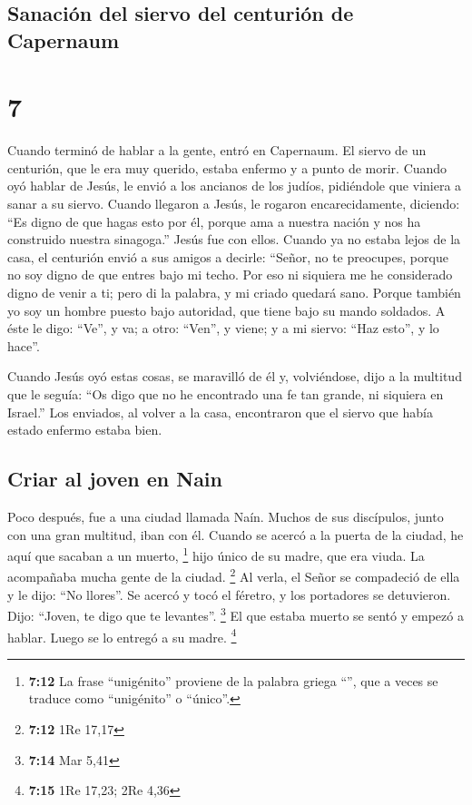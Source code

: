 \hypertarget{sanaciuxf3n-del-siervo-del-centuriuxf3n-de-capernaum}{%
\subsection{Sanación del siervo del centurión de
Capernaum}\label{sanaciuxf3n-del-siervo-del-centuriuxf3n-de-capernaum}}

\hypertarget{section-6}{%
\section{7}\label{section-6}}

 Cuando terminó de hablar a la gente, entró en Capernaum.
 El siervo de un centurión, que le era muy querido, estaba
enfermo y a punto de morir.  Cuando oyó hablar de Jesús,
le envió a los ancianos de los judíos, pidiéndole que viniera a sanar a
su siervo.  Cuando llegaron a Jesús, le rogaron
encarecidamente, diciendo: ``Es digno de que hagas esto por él,
 porque ama a nuestra nación y nos ha construido nuestra
sinagoga.''  Jesús fue con ellos. Cuando ya no estaba
lejos de la casa, el centurión envió a sus amigos a decirle: ``Señor, no
te preocupes, porque no soy digno de que entres bajo mi techo.
 Por eso ni siquiera me he considerado digno de venir a
ti; pero di la palabra, y mi criado quedará sano.  Porque
también yo soy un hombre puesto bajo autoridad, que tiene bajo su mando
soldados. A éste le digo: ``Ve'', y va; a otro: ``Ven'', y viene; y a mi
siervo: ``Haz esto'', y lo hace''.

 Cuando Jesús oyó estas cosas, se maravilló de él y,
volviéndose, dijo a la multitud que le seguía: ``Os digo que no he
encontrado una fe tan grande, ni siquiera en Israel.'' 
Los enviados, al volver a la casa, encontraron que el siervo que había
estado enfermo estaba bien.

\hypertarget{criar-al-joven-en-nain}{%
\subsection{Criar al joven en Nain}\label{criar-al-joven-en-nain}}

 Poco después, fue a una ciudad llamada Naín. Muchos de
sus discípulos, junto con una gran multitud, iban con él.
 Cuando se acercó a la puerta de la ciudad, he aquí que
sacaban a un muerto, \footnote{\textbf{7:12} La frase ``unigénito''
  proviene de la palabra griega ``'', que a veces se
  traduce como ``unigénito'' o ``único''.} hijo único de su madre, que
era viuda. La acompañaba mucha gente de la ciudad. \footnote{\textbf{7:12}
  1Re 17,17}  Al verla, el Señor se compadeció de ella y
le dijo: ``No llores''.  Se acercó y tocó el féretro, y
los portadores se detuvieron. Dijo: ``Joven, te digo que te levantes''.
\footnote{\textbf{7:14} Mar 5,41}  El que estaba muerto
se sentó y empezó a hablar. Luego se lo entregó a su madre. \footnote{\textbf{7:15}
  1Re 17,23; 2Re 4,36}

